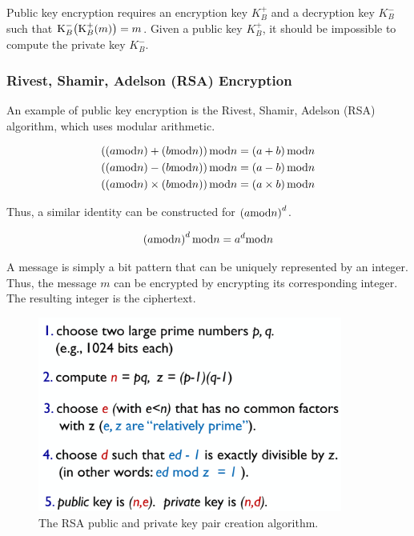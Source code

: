Public key encryption requires an encryption key \(K_B^+\) and a decryption key \(K_B^-\) such that \(\textup{K}_{B}^{-}\!\left( \textup{K}_{B}^{+}\!\left( m \right) \right) = m\).
Given a public key \(K_B^+\), it should be impossible to compute the private key \(K_B^-\).

\subsubsection{Rivest, Shamir, Adelson (RSA) Encryption}

An example of public key encryption is the Rivest, Shamir, Adelson (RSA) algorithm, which uses modular arithmetic.

\begin{align*}
  \left(\left(a \textup{mod} n\right) + \left(b \textup{mod} n\right)\right) \textup{mod} n = \left(a + b\right) \textup{mod} n \\
  \left(\left(a \textup{mod} n\right) - \left(b \textup{mod} n\right)\right) \textup{mod} n = \left(a - b\right) \textup{mod} n \\
  \left(\left(a \textup{mod} n\right) \times \left(b \textup{mod} n\right)\right) \textup{mod} n = \left(a \times b\right) \textup{mod} n \\
\end{align*}

Thus, a similar identity can be constructed for \(\left(a \textup{mod} n\right)^d\).

\begin{equation*}
  \left(a \textup{mod} n\right)^d \textup{mod} n = a^d \textup{mod} n \\
\end{equation*}

A message is simply a bit pattern that can be uniquely represented by an integer.
Thus, the message \(m\) can be encrypted by encrypting its corresponding integer.
The resulting integer is the ciphertext.

\begin{figure}[htp]
  \centering
  \includegraphics[width=10cm]{unit-20/figures/rsa.png}
  \caption*{The RSA public and private key pair creation algorithm.}
\end{figure}

